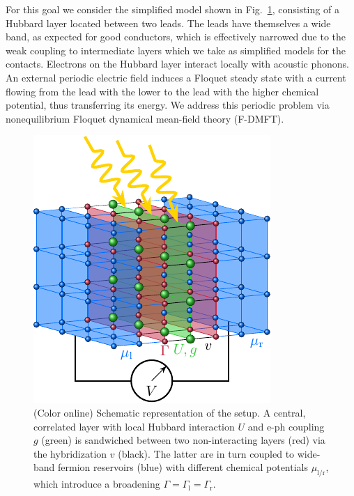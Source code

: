 \documentclass[aps,prb,groupedaddress,showpacs,twocolumn,superscriptaddress,10pt]{revtex4-2}
\begin{document}
For this goal we consider the simplified model shown in Fig.~\ref{fig:setup}, consisting of a Hubbard layer located between two leads. The leads have themselves a wide band, as expected for good conductors, which is effectively narrowed due to the weak coupling to intermediate layers which we take as simplified models for the contacts. Electrons on the Hubbard layer interact locally with acoustic phonons. An external periodic electric field induces a Floquet steady state with a current flowing from the lead with the lower to the lead with the higher chemical potential, thus transferring its energy.
 We address this periodic problem via nonequilibrium Floquet dynamical mean-field theory (F-DMFT).
 
  
\begin{figure}[b] 
\includegraphics[width=0.9\linewidth]{./figures_Paper1/setup_voltmeter.pdf}
\caption{(Color online) Schematic representation of the setup. A central, correlated layer with local Hubbard interaction $U$ and e-ph coupling $g$ (green) is sandwiched between two non-interacting layers (red) via the hybridization $v$ (black). The latter are in turn coupled to wide-band fermion reservoirs (blue) with different chemical potentials $\mu_{\text{l}/\text{r}}$, which introduce a broadening $\Gamma=\Gamma_{\text{l}}=\Gamma_{\text{r}}$.}
\label{fig:setup}
\end{figure}   
    
\end{document}
